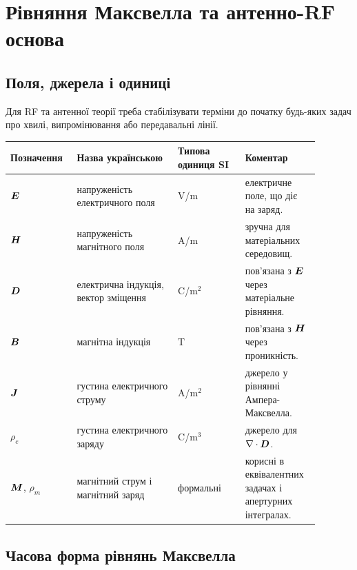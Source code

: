 \chapter{Рівняння Максвелла та антенно-RF основа}
\label{ch:maxwell-antenna-foundations}


\section{Поля, джерела і одиниці}

Для RF та антенної теорії треба стабілізувати терміни до початку будь-яких задач про хвилі, випромінювання або передавальні лінії.

\begin{longtable}{L{0.17\linewidth}L{0.30\linewidth}L{0.20\linewidth}L{0.22\linewidth}}
\toprule
\textbf{Позначення} & \textbf{Назва українською} & \textbf{Типова одиниця SI} & \textbf{Коментар}\\
\midrule
$\bm{E}$ & напруженість електричного поля & V/m & електричне поле, що діє на заряд.\\
$\bm{H}$ & напруженість магнітного поля & A/m & зручна для матеріальних середовищ.\\
$\bm{D}$ & електрична індукція, вектор зміщення & C/m$^2$ & пов'язана з $\bm{E}$ через матеріальне рівняння.\\
$\bm{B}$ & магнітна індукція & T & пов'язана з $\bm{H}$ через проникність.\\
$\bm{J}$ & густина електричного струму & A/m$^2$ & джерело у рівнянні Ампера-Максвелла.\\
$\rho_e$ & густина електричного заряду & C/m$^3$ & джерело для $\nabla\cdot\bm{D}$.\\
$\bm{M}$, $\rho_m$ & магнітний струм і магнітний заряд & формальні & корисні в еквівалентних задачах і апертурних інтегралах.\\
\bottomrule
\end{longtable}

\section{Часова форма рівнянь Максвелла}

